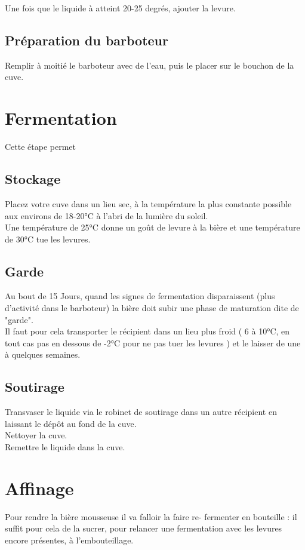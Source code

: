\documentclass[twoside,twocolumn]{report}
\begin{document}
		Une fois que le liquide à atteint 20-25 degrés, ajouter la levure.\\
		
		\subsection{Préparation du barboteur}
		Remplir à moitié le barboteur avec de l’eau, puis le placer sur le bouchon
		de la cuve.
		
		\section{Fermentation}
		Cette étape permet 
		\subsection{Stockage}
		Placez votre cuve dans un lieu sec, à la température la
		plus constante possible aux environs de 18-20°C à l’abri de
		la lumière  du soleil.\\
		Une température de 25°C donne un goût de levure à la bière et une température de 30°C tue les levures.\\
		\subsection{Garde}
		Au bout de 15 Jours, quand les signes de fermentation disparaissent (plus d’activité dans le barboteur) la bière doit subir une phase de maturation dite de "garde".\\
		Il faut pour cela transporter le récipient dans un lieu plus froid ( 6 à 10°C, en tout cas pas en dessous de -2°C pour ne pas tuer les levures ) et le laisser de une à quelques semaines.
		\subsection{Soutirage}
		Transvaser le liquide via le robinet de soutirage dans un autre récipient en laissant le dépôt au fond de la cuve.\\
		Nettoyer la cuve.\\
		Remettre le liquide dans la cuve.\\
		
		\section{Affinage}
		Pour rendre la bière mousseuse il va falloir la faire re- fermenter en bouteille : il suffit pour cela	 de la sucrer, pour relancer une fermentation avec les levures encore présentes, à l’embouteillage.
\end{document}
